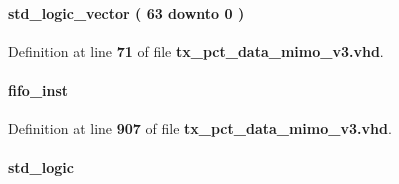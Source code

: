 \paragraph[{fifo2\+\_\+samplenr\+\_\+d1}]{ {\bfseries \textcolor{comment}{std\+\_\+logic\+\_\+vector}\textcolor{vhdlchar}{ }\textcolor{vhdlchar}{(}\textcolor{vhdlchar}{ }\textcolor{vhdlchar}{ } \textcolor{vhdldigit}{63} \textcolor{vhdlchar}{ }\textcolor{keywordflow}{downto}\textcolor{vhdlchar}{ }\textcolor{vhdlchar}{ } \textcolor{vhdldigit}{0} \textcolor{vhdlchar}{ }\textcolor{vhdlchar}{)}\textcolor{vhdlchar}{ }} \hspace{0.3cm}{\ttfamily [Signal]}}\label{classtx__pct__data__mimo__v3_1_1arch_a12828b170fd230192b275fb24f99fb86}


Definition at line {\bf 71} of file {\bf tx\+\_\+pct\+\_\+data\+\_\+mimo\+\_\+v3.\+vhd}.

\paragraph[{fifo3}]{ {\bfseries \textcolor{vhdlchar}{fifo\+\_\+inst}\textcolor{vhdlchar}{ }} \hspace{0.3cm}{\ttfamily [Instantiation]}}\label{classtx__pct__data__mimo__v3_1_1arch_aad8d902dddc8a5fabdebc5273205e7ad}


Definition at line {\bf 907} of file {\bf tx\+\_\+pct\+\_\+data\+\_\+mimo\+\_\+v3.\+vhd}.

\paragraph[{fifo3\+\_\+data\+\_\+rdy}]{ {\bfseries \textcolor{comment}{std\+\_\+logic}\textcolor{vhdlchar}{ }} \hspace{0.3cm}{\ttfamily [Signal]}}\label{classtx__pct__data__mimo__v3_1_1arch_aa0ae8631ba95ad2a6d3c1f6e4aff535e}


